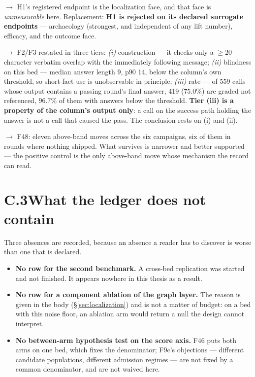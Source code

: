 \begin{description}[leftmargin=0pt,labelindent=0pt,labelsep=0pt,style=nextline,font=\normalfont,itemsep=5pt]
\item[``H1 is falsified'', unqualified] $\to$ H1's registered endpoint is
the localization face, and that face is \emph{unmeasurable} here.
Replacement: \textbf{H1 is rejected on its declared surrogate endpoints}
--- archaeology (strongest, and independent of any lift number), efficacy,
and the outcome face.

\item[``The evidence column has a 75\% false-negative rate'',
      with the implication that those calls mattered] $\to$ F2/F3 restated
in three tiers: \emph{(i)} construction --- it checks only a
$\ge 20$-character verbatim overlap with the immediately following message;
\emph{(ii)} blindness on this bed --- median answer length 9, p90 14, below
the column's own threshold, so short-fact use is unobservable in principle;
\emph{(iii)} rate --- of 559 calls whose output contains a passing round's
final answer, 419 ($75.0\%$) are graded not referenced, $96.7\%$ of them
with answers below the threshold. \textbf{Tier (iii) is a property of the
column's output only}: a call on the success path holding the answer is
not a call that caused the pass. The conclusion rests on (i) and (ii).

\item[``The one ratchet click is the only above-band move''] $\to$ F48:
eleven above-band moves across the six campaigns, six of them in rounds
where nothing shipped. What survives is narrower and better supported ---
the positive control is the only above-band move whose mechanism the record
can read.

\end{description}

\section*{C.3\quad What the ledger does not contain}

Three absences are recorded, because an absence a reader has to discover is
worse than one that is declared.

\begin{itemize}
  \item \textbf{No row for the second benchmark.} A cross-bed replication
        was started and not finished. It appears nowhere in this thesis as
        a result.
  \item \textbf{No row for a component ablation of the graph layer.} The
        reason is given in the body (\S\ref{sec:localization}) and is not a
        matter of budget: on a bed with this noise floor, an ablation arm
        would return a null the design cannot interpret.
  \item \textbf{No between-arm hypothesis test on the score axis.} F46 puts
        both arms on one bed, which fixes the denominator; F9c's objections
        --- different candidate populations, different admission regimes
        --- are not fixed by a common denominator, and are not waived here.
\end{itemize}
